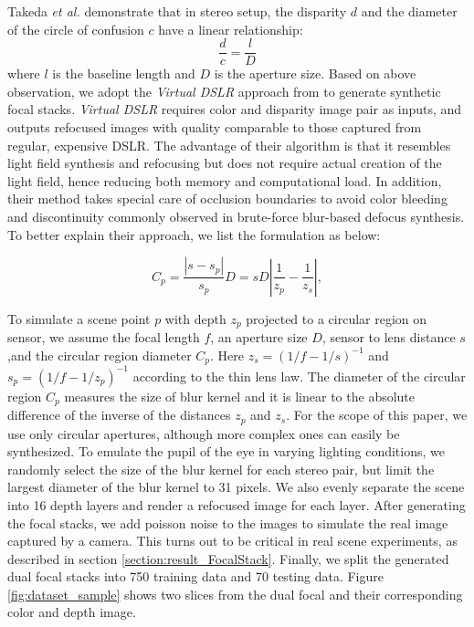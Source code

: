 \documentclass[10pt,twocolumn,letterpaper]{article}
\begin{document}
Takeda \emph{et al.} \cite{takeda2013fusing} demonstrate that in stereo setup, the disparity $d$ and the diameter of the circle of confusion $c$ have a linear relationship:
\begin{equation}
\frac{d}{c} = \frac{l}{D}
\end{equation}
where $l$ is the baseline length and $D$ is the aperture size. Based on above observation, we adopt the \emph{Virtual DSLR} approach from \cite{yang16} to generate synthetic focal stacks. \emph{Virtual DSLR} requires color and disparity image pair as inputs, and outputs refocused images with quality comparable to those captured from regular, expensive DSLR. The advantage of their algorithm is that it resembles light field synthesis and refocusing but does not require actual creation of the light field, hence reducing both memory and computational load. In addition, their method takes special care of occlusion boundaries to avoid color bleeding and discontinuity commonly observed in brute-force blur-based defocus synthesis.
To better explain their approach, we list the formulation as below:

\begin{equation}
C_p = \frac{|s-s_p|}{s_p}D = sD|\frac{1}{z_p} - \frac{1}{z_s}|,
\end{equation}

To simulate a scene point $p$ with depth $z_p$ projected to a circular region on sensor, we assume the focal length $f$, an aperture size $D$, sensor to lens distance $s$,and the circular region diameter $C_p$. Here $z_s = (1/f - 1/s)^{-1}$ and $s_p = (1/f - 1/z_p)^{-1}$ according to the thin lens law. The diameter of the circular region $C_p$ measures the size of blur kernel and it is linear to the absolute difference of the inverse of the distances $z_p$ and $z_s$. For the scope of this paper, we use only circular apertures, although more complex ones can easily be synthesized. To emulate the pupil of the eye in varying lighting conditions, we randomly select the size of the blur kernel for each stereo pair, but limit the largest diameter of the blur kernel to 31 pixels. We also evenly separate the scene into 16 depth layers and render a refocused image for each layer. After generating the focal stacks, we add poisson noise to the images to simulate the real image captured by a camera. This turns out to be critical in real scene experiments, as described in section \ref{section:result_FocalStack}. Finally, we split the generated dual focal stacks into 750 training data and 70 testing data. Figure \ref{fig:dataset_sample} shows two slices from the dual focal and their corresponding color and depth image.
\end{document}
